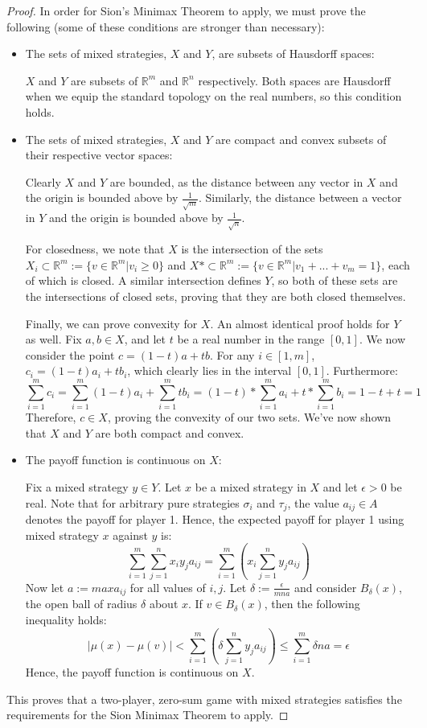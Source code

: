 \documentclass[12pt]{article}
\theoremstyle{definition}
\theoremstyle{remark}
\begin{document}
\begin{proof}
In order for Sion's Minimax Theorem to apply, we must prove the following (some of these conditions are stronger than necessary):
\begin{itemize}
	\item{The sets of mixed strategies, $X$ and $Y$, are subsets of Hausdorff spaces:

		$X$ and $Y$ are subsets of $\mathbb{R}^m$ and $\mathbb{R}^n$ respectively. Both spaces are Hausdorff when we equip the standard topology on the real numbers, so this condition holds.
	}
	\item{The sets of mixed strategies, $X$ and $Y$ are compact and convex subsets of their respective vector spaces:

		Clearly $X$ and $Y$ are bounded, as the distance between any vector in $X$ and the origin is bounded above by $\frac{1}{\sqrt{m}}$. Similarly, the distance between a vector in $Y$ and the origin is bounded above by $\frac{1}{\sqrt{n}}$.

		For closedness, we note that $X$ is the intersection of the sets $X_i \subset \mathbb{R}^m := \{v \in \mathbb{R}^m | v_i \geq 0\}$ and $X* \subset \mathbb{R}^m := \{v \in \mathbb{R}^m | v_1 + ... + v_m = 1\}$, each of which is closed. A similar intersection defines $Y$, so both of these sets are the
		intersections of closed sets, proving that they are both closed themselves.

		Finally, we can prove convexity for $X$. An almost identical proof holds for $Y$ as well. Fix $a,b \in X$, and let $t$ be a real number in the range $[0,1]$. We now consider the point $c = (1-t)a + tb$. For any $i \in [1,m]$, $c_i = (1-t)a_i + tb_i$, which clearly lies in the interval $[0,1]$. Furthermore:
		\[
			\sum_{i=1}^m c_i = \sum_{i=1}^m (1-t)a_i + \sum_{i=1}^m tb_i = (1-t) * \sum_{i=1}^m a_i + t * \sum_{i=1}^m b_i = 1-t+t = 1
		\]
		Therefore, $c \in X$, proving the convexity of our two sets. We've now shown that $X$ and $Y$ are both compact and convex.
	}
	\item{The payoff function is continuous on $X$:

		Fix a mixed strategy $y \in Y$. Let $x$ be a mixed strategy in $X$ and let $\epsilon > 0$ be real. Note that for arbitrary pure strategies $\sigma_i$ and $\tau_j$, the value $a_{ij} \in A$ denotes the payoff for player 1. Hence, the expected payoff for player 1 using mixed strategy $x$ against $y$ is:
		\[
			\sum_{i=1}^m \sum_{j=1}^n x_i y_j a_{ij} = \sum_{i=1}^m (x_i \sum_{j=1}^n y_j a_{ij})
		\]
		Now let $a := max a_{ij}$ for all values of $i,j$. Let $\delta := \frac{\epsilon}{mna}$ and consider $B_\delta(x)$, the open ball of radius $\delta$ about $x$. If $v \in B_\delta(x)$, then the following inequality holds:
		\[
			|\mu(x) - \mu(v)| <  \sum_{i=1}^m (\delta \sum_{j=1}^n y_j a_{ij}) \leq \sum_{i=1}^m \delta n a = \epsilon
		\]
		Hence, the payoff function is continuous on $X$.
	}
\end{itemize}
This proves that a two-player, zero-sum game with mixed strategies satisfies the requirements for the Sion Minimax Theorem to apply.
\end{proof}
\end{document}
